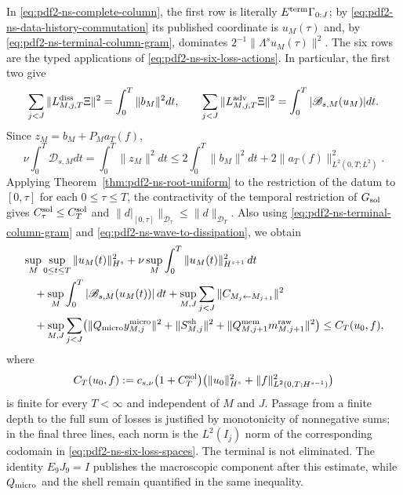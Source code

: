 In \eqref{eq:pdf2-ns-complete-column}, the first row is literally
$\mathcal E^{\rm term}\Gamma_{0:J}$; by
\eqref{eq:pdf2-ns-data-history-commutation} its published coordinate is
$u_M(\tau)$ and, by \eqref{eq:pdf2-ns-terminal-column-gram}, dominates
$2^{-1}\|\Lambda^su_M(\tau)\|^2$. The six rows are the typed applications of
\eqref{eq:pdf2-ns-six-loss-actions}. In particular, the first two give
\[
 \sum_{j<J}\|L^{\rm diss}_{M,j,T}\Xi\|^2
 =\int_0^T\|b_M\|^2dt,
 \qquad
 \sum_{j<J}\|L^{\rm adv}_{M,j,T}\Xi\|^2
 =\int_0^T|\mathscr B_{s,M}(u_M)|dt.
\]
Since $z_M=b_M+P_Ma_T(f)$,
\begin{equation}\label{eq:pdf2-ns-wave-to-dissipation}
 \nu\int_0^T \mathscr D_{s,M}dt
 =\int_0^T\|z_M\|^2dt
 \leq2\int_0^T\|b_M\|^2dt+2\|a_T(f)\|_{L^2(0,T;L^2)}^2.
\end{equation}
Applying Theorem~\ref{thm:pdf2-ns-root-uniform} to the restriction of the datum to
$[0,\tau]$ for each $0\le\tau\le T$, the contractivity of the temporal
restriction of $\mathfrak G_{\rm sol}$ gives
$C_\tau^{\rm sol}\le C_T^{\rm sol}$ and
$\|d|_{[0,\tau]}\|_{\mathcal D_\tau}\le\|d\|_{\mathcal D_T}$. Also using
\eqref{eq:pdf2-ns-terminal-column-gram} and
\eqref{eq:pdf2-ns-wave-to-dissipation}, we obtain
\begin{equation}\label{eq:pdf2-ns-cota-requerida}
 \begin{aligned}
 &\sup_M\sup_{0\le t\le T}\|u_M(t)\|_{H^s}^2
 +\nu\sup_M\int_0^T\|u_M(t)\|_{H^{s+1}}^2\,dt\\
 &\quad
 +\sup_M\int_0^T|\mathscr B_{s,M}(u_M(t))|\,dt
 +\sup_{M,J}\sum_{j<J}\|C_{M_j\leftarrow M_{j+1}}\|^2\\
 &\quad
 +\sup_{M,J}\sum_{j<J}
   \bigl(\|Q_{\rm micro}y^{\rm micro}_{M,j}\|^2
          +\|\mathcal S_{M,j}^{\rm sh}\|^2
          +\|Q^{\rm mem}_{M,j+1}m^{\rm raw}_{M,j+1}\|^2\bigr)
 \le C_T(u_0,f),
 \end{aligned}
\end{equation}
where
\[
 C_T(u_0,f):=c_{s,\nu}\bigl(1+C_T^{\rm sol}\bigr)
 \bigl(\|u_0\|_{H^s}^2+
       \|f\|_{L^2(0,T;H^{s-1})}^2\bigr)
\]
is finite for every $T<\infty$ and independent of $M$ and $J$. Passage from a finite depth to the full sum of losses is justified by monotonicity of nonnegative sums; in the final three lines, each norm is the $L^2(I_j)$ norm of the corresponding codomain in \eqref{eq:pdf2-ns-six-loss-spaces}. The terminal is not eliminated. The identity $E_9J_9=I$ publishes the macroscopic component after this estimate, while $Q_{\rm micro}$ and the shell remain quantified in the same inequality.

